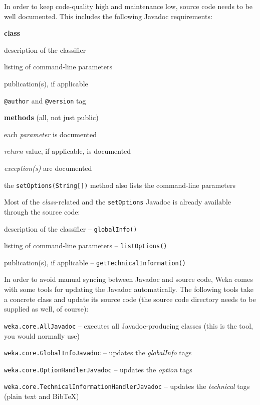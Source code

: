\newpage
{}
\label{classifier_javadoc}
In order to keep code-quality high and maintenance low, source code needs to
be well documented. This includes the following Javadoc requirements:
\begin{tight_itemize}
  \item \textbf{class}
    \begin{tight_itemize}
      \item description of the classifier
      \item listing of command-line parameters
      \item publication(s), if applicable
      \item \texttt{@author} and \texttt{@version} tag
    \end{tight_itemize}

  \item \textbf{methods} (all, not just public)
    \begin{tight_itemize}
      \item each \textit{parameter} is documented
      \item \textit{return} value, if applicable, is documented
      \item \textit{exception(s)} are documented
      \item the \texttt{setOptions(String[])} method also lists the
command-line parameters
    \end{tight_itemize}
\end{tight_itemize}
Most of the \textit{class}-related and the \texttt{setOptions} Javadoc is
already available through the source code:
\begin{tight_itemize}
  \item description of the classifier -- \texttt{globalInfo()}
  \item listing of command-line parameters -- \texttt{listOptions()}
  \item publication(s), if applicable -- \texttt{getTechnicalInformation()}
\end{tight_itemize}
In order to avoid manual syncing between Javadoc and source code, Weka comes
with some tools for updating the Javadoc automatically. The following tools take
a concrete class and update its source code (the source code directory needs to
be supplied as well, of course):
\begin{tight_itemize}
  \item \texttt{weka.core.AllJavadoc} -- executes all Javadoc-producing
classes (this is the tool, you would normally use)
  \item \texttt{weka.core.GlobalInfoJavadoc} -- updates the \textit{globalInfo}
tags
  \item \texttt{weka.core.OptionHandlerJavadoc} -- updates the \textit{option}
tags
  \item \texttt{weka.core.TechnicalInformationHandlerJavadoc} -- updates the
\textit{technical} tags (plain text and BibTeX)
\end{tight_itemize}
